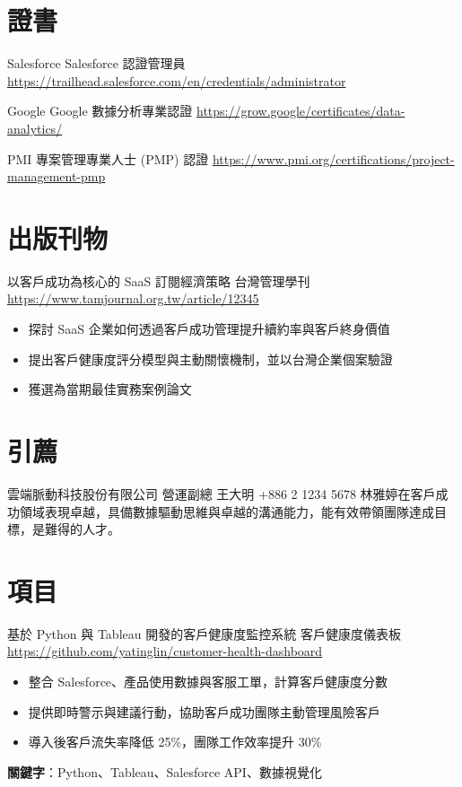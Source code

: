 \documentclass[a4paper, serif, 10pt]{moderncv}
\begin{document}
\section{證書}

        {Salesforce}
        {Salesforce 認證管理員}
        {\url{https://trailhead.salesforce.com/en/credentials/administrator}}
        {}
        {}

        {Google}
        {Google 數據分析專業認證}
        {\url{https://grow.google/certificates/data-analytics/}}
        {}
        {}

        {PMI}
        {專案管理專業人士 (PMP) 認證}
        {\url{https://www.pmi.org/certifications/project-management-pmp}}
        {}
        {}
\section{出版刊物}

        {以客戶成功為核心的 SaaS 訂閱經濟策略}
        {台灣管理學刊}
        {\url{https://www.tamjournal.org.tw/article/12345}}
        {}
        {\begin{itemize}
\item 探討 SaaS 企業如何透過客戶成功管理提升續約率與客戶終身價值
\item 提出客戶健康度評分模型與主動關懷機制，並以台灣企業個案驗證
\item 獲選為當期最佳實務案例論文
\end{itemize}}
\section{引薦}

        {雲端脈動科技股份有限公司 營運副總}
        {王大明}
        {+886 2 1234 5678}
        {}
        {林雅婷在客戶成功領域表現卓越，具備數據驅動思維與卓越的溝通能力，能有效帶領團隊達成目標，是難得的人才。}
\section{項目}

        {基於 Python 與 Tableau 開發的客戶健康度監控系統}
        {客戶健康度儀表板}
        {\url{https://github.com/yatinglin/customer-health-dashboard}}
        {}
        {\begin{itemize}
\item 整合 Salesforce、產品使用數據與客服工單，計算客戶健康度分數
\item 提供即時警示與建議行動，協助客戶成功團隊主動管理風險客戶
\item 導入後客戶流失率降低 25\%，團隊工作效率提升 30\%
\end{itemize}
\textbf{關鍵字}：Python、Tableau、Salesforce API、數據視覺化}
\end{document}
